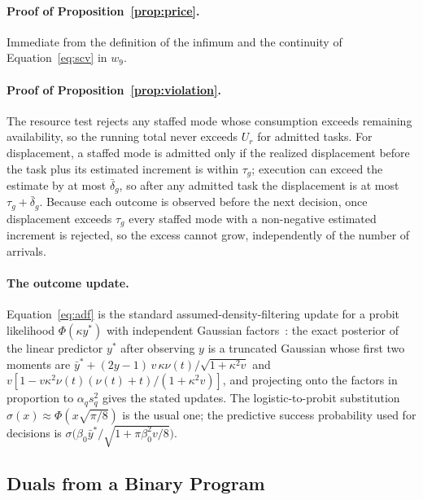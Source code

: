 \documentclass[utf8]{frontiers_suppmat}
\begin{document}
\paragraph*{Proof of Proposition~\ref{prop:price}.}
	Immediate from the definition of the infimum and the continuity of Equation~\eqref{eq:scv} in $w_9$.

\paragraph*{Proof of Proposition~\ref{prop:violation}.}
	The resource test rejects any staffed mode whose consumption exceeds remaining availability, so the running total never exceeds $U_r$ for admitted tasks. For displacement, a staffed mode is admitted only if the realized displacement before the task plus its estimated increment is within $\tau_g$; execution can exceed the estimate by at most $\bar\delta_g$, so after any admitted task the displacement is at most $\tau_g+\bar\delta_g$. Because each outcome is observed before the next decision, once displacement exceeds $\tau_g$ every staffed mode with a non-negative estimated increment is rejected, so the excess cannot grow, independently of the number of arrivals.

\paragraph*{The outcome update.}
	Equation~\eqref{eq:adf} is the standard assumed-density-filtering update for a probit likelihood $\Phi(\kappa y^{\ast})$ with independent Gaussian factors~\citep{Minka2001}: the exact posterior of the linear predictor $y^{\ast}$ after observing $y$ is a truncated Gaussian whose first two moments are $\bar y^{\ast}+(2y-1)\,v\,\kappa\nu(t)/\sqrt{1+\kappa^2v}$ and $v[1-v\kappa^2\nu(t)(\nu(t)+t)/(1+\kappa^2v)]$, and projecting onto the factors in proportion to $\alpha_q s_q^2$ gives the stated updates. The logistic-to-probit substitution $\sigma(x)\approx\Phi(x\sqrt{\pi/8})$ is the usual one; the predictive success probability used for decisions is $\sigma\bigl(\beta_0\bar y^{\ast}/\sqrt{1+\pi\beta_0^2v/8}\bigr)$.

\subsection{Duals from a Binary Program}
\label{app:proofs-duals}
\end{document}
